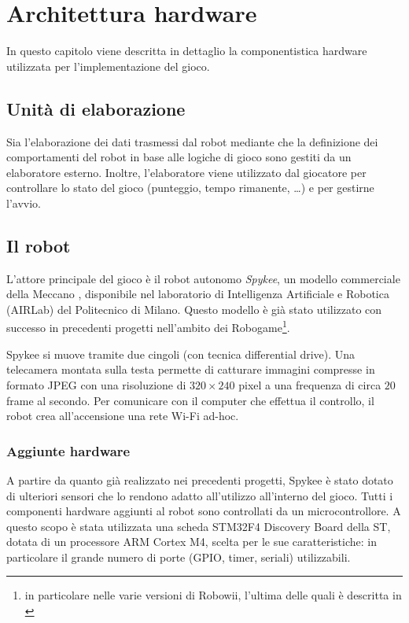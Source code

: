 \chapter{Architettura hardware}
\label{cap:architettura}

In questo capitolo viene descritta in dettaglio la componentistica hardware utilizzata per l'implementazione del gioco.

\section{Unità di elaborazione}
Sia l'elaborazione dei dati trasmessi dal robot mediante che la definizione dei comportamenti del robot in base alle logiche di gioco sono gestiti da un elaboratore esterno. Inoltre, l'elaboratore viene utilizzato dal giocatore per controllare lo stato del gioco (punteggio, tempo rimanente, \dots) e per gestirne l'avvio.

\section{Il robot}


L'attore principale del gioco è il robot autonomo \emph{Spykee}, un modello commerciale della Meccano \cite{spykeeweb}, disponibile nel laboratorio di Intelligenza Artificiale e Robotica (AIRLab) del Politecnico di Milano. Questo modello è già stato utilizzato con successo in precedenti progetti nell'ambito dei Robogame\footnote{in particolare nelle varie versioni di Robowii, l'ultima delle quali è descritta in \cite{robowii}}.

Spykee si muove tramite due cingoli (con tecnica differential drive). Una telecamera montata sulla testa permette di catturare immagini compresse in formato JPEG con una risoluzione di $320 \times 240$ pixel a una frequenza di circa $20$ frame al secondo. Per comunicare con il computer che effettua il controllo, il robot crea all'accensione una rete Wi-Fi ad-hoc.

\subsection*{Aggiunte hardware}
A partire da quanto già realizzato nei precedenti progetti, Spykee è stato dotato di ulteriori sensori che lo rendono adatto all'utilizzo all'interno del gioco. Tutti i componenti hardware aggiunti al robot sono controllati da un microcontrollore. A questo scopo è stata utilizzata una scheda STM32F4 Discovery Board della ST, dotata di un processore ARM Cortex M4, scelta per le sue caratteristiche: in particolare il grande numero di porte (GPIO, timer, seriali) utilizzabili.

